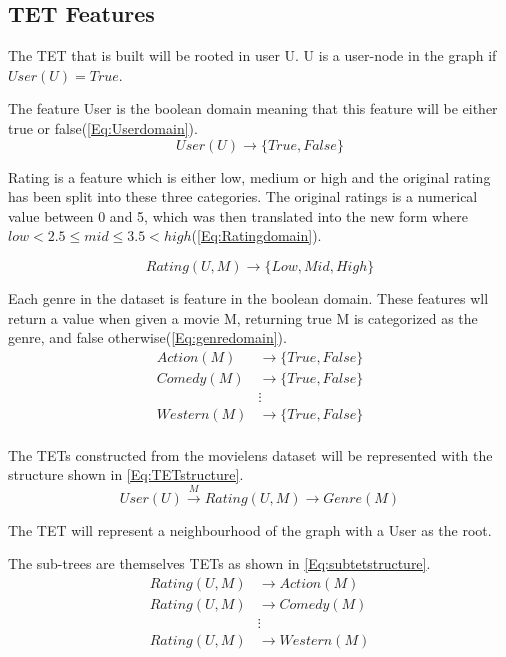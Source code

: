 \subsection{TET Features}
The TET that is built will be rooted in user U.
U is a user-node in the graph if $User(U) = True$. 

The feature User is the boolean domain meaning that this feature will be either true or false(\autoref{Eq:Userdomain}).
\begin{equation}\label{Eq:Userdomain}
User(U)\rightarrow \{True, False\}
\end{equation}

Rating is a feature which is either low, medium or high and the original rating has been split into these three categories.
The original ratings is a numerical value between 0 and 5, which was then translated into the new form where $low<2.5\leq mid \leq 3.5<high$(\autoref{Eq:Ratingdomain}).

\begin{equation}\label{Eq:Ratingdomain}
Rating(U, M) \rightarrow \{Low, Mid, High\}
\end{equation}

Each genre in the dataset is feature in the boolean domain. These features wll return a value when given a movie M, returning true M is categorized as the genre, and false otherwise(\autoref{Eq:genredomain}).
\begin{equation}\label{Eq:genredomain}
\begin{aligned}
Action(M)& \rightarrow \{True, False\} \\
Comedy(M)& \rightarrow \{True, False\} \\
&\vdots \\
Western(M)& \rightarrow \{True, False\} \\
\end{aligned}
\end{equation}

The TETs constructed from the movielens dataset will be represented with the structure shown in \autoref{Eq:TETstructure}.
\begin{equation}\label{Eq:TETstructure}
User(U) \stackrel{M}{\longrightarrow} Rating(U,M) \longrightarrow Genre(M)
\end{equation}

The TET will represent a neighbourhood of the graph with a User as the root.

The sub-trees are themselves TETs as shown in \autoref{Eq:subtetstructure}.
\begin{equation}\label{Eq:subtetstructure}
\begin{aligned}
Rating(U,M)& \longrightarrow Action(M) \\
Rating(U,M)& \longrightarrow Comedy(M)\\
& \vdots \\
Rating(U,M)& \longrightarrow Western(M)
\end{aligned}	
\end{equation}

